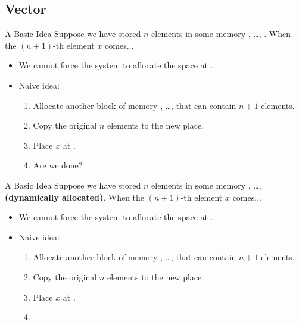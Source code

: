 \documentclass{beamer}
\begin{document}
\subsection{Vector}

\begin{frame}{A Basic Idea}
    Suppose we have stored \(n\) elements in some  memory , \dots, . When the \((n+1)\)-th element \(x\) comes...
    \begin{itemize}
        \item We cannot force the system to allocate the space at .
        \pause
        \item Naive idea:
        \begin{enumerate}
            \item Allocate another block of memory , \dots,  that can contain \(n+1\) elements.
            \item Copy the original \(n\) elements to the new place.
            \item Place \(x\) at .
            \pause
            \item Are we done?
        \end{enumerate}
    \end{itemize}
\end{frame}

\begin{frame}{A Basic Idea}
    Suppose we have stored \(n\) elements in some  memory , \dots,  \textbf{(dynamically allocated)}. When the \((n+1)\)-th element \(x\) comes...
    \begin{itemize}
        \item We cannot force the system to allocate the space at .
        \item Naive idea:
        \begin{enumerate}
            \item Allocate another block of memory , \dots,  that can contain \(n+1\) elements.
            \item Copy the original \(n\) elements to the new place.
            \item Place \(x\) at .
            \item {}
        \end{enumerate}
    \end{itemize}
\end{frame}
\end{document}
